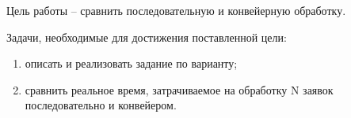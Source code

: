 
Цель работы -- сравнить последовательную и конвейерную обработку.

Задачи, необходимые для достижения поставленной цели:
\begin{enumerate}
	\item описать и реализовать задание по варианту;
	\item сравнить реальное время, затрачиваемое на обработку N заявок последовательно и конвейером.
\end{enumerate}







\clearpage
